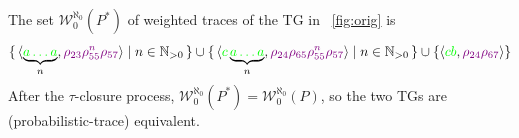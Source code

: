 \begin{example}
	The set $\mathcal{W}_0^{\aleph_0}(P^*)$ of weighted traces of the TG in \figurename~\ref{fig:orig} is
$$\set{\braket{\underbrace{\color{green}a\dots a}_{n},{\color{violet}\rho_{23}\rho_{55}^n\rho_{57}}}|n\in \mathbb{N}_{>0}}\cup \set{\braket{{\color{green}c}\underbrace{\color{green}a\dots a}_{n},{\color{violet}\rho_{24}\rho_{65}\rho_{55}^n\rho_{57}}}|n\in \mathbb{N}_{>0}}\cup\{\braket{{\color{green}cb},{\color{violet}\rho_{24}\rho_{67}}}\}$$
After the $\tau$-closure process, $\mathcal{W}_0^{\aleph_0}(P^*)=\mathcal{W}_0^{\aleph_0}(P)$, so the two TGs are (probabilistic-trace) equivalent.
\end{example}
